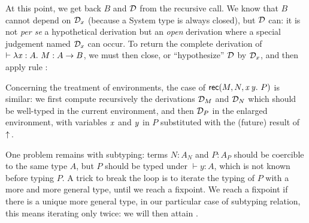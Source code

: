 \documentclass{llncs}
\begin{document}
At this point, we get back $B$ and $\mathcal D$ from the recursive call. We
know that $B$ cannot depend on $\mathcal D_x$ (because a System
 type is always closed), but $\mathcal D$ can: it is not
\emph{per se} a hypothetical derivation but an \emph{open} derivation
where a special judgement named $\mathcal D_x$ can occur. To return the
complete derivation of $\vdash\lambda{\ensuremath{\text{\textit{x}}}}:{A}.\  M : A \to B$, we must then
close, or ``hypothesize'' $\mathcal D$ by $\mathcal D_x$, and then apply rule
:

\begin{mathleft}
  \quad\quad
  {}
\end{mathleft}

Concerning the treatment of environments, the case of $\text{\textsf{rec}}({M},{N},{\text{\textit{x}}}\,{\text{\textit{y}}}.\ {P})$ is similar: we first compute recursively the derivations $\mathcal D_M$
and $\mathcal D_N$ which should be well-typed in the current environment, and
then $\mathcal D_P$ in the enlarged environment, with variables $\text{\textit{x}}$ and
$\text{\textit{y}}$ in $P$ substituted with the (future) result of $\uparrow\!{}$.

One problem remains with subtyping: terms $N : A_N$ and $P : A_P$
should be coercible to the same type $A$, but $P$ should be typed
under $\vdash y:A$, which is not known before typing $P$. A trick to
break the loop is to iterate the typing of $P$ with a more and more
general type, until we reach a fixpoint. We reach a fixpoint if there
is a unique more general type, in our particular case of subtyping
relation, this means iterating only twice: we will then attain
.
\end{document}
